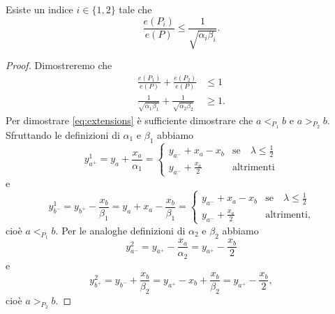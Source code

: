 \appendix
\begin{theorem}
    Esiste un indice \(i\in\{1,2\}\) tale che \[\frac{e(P_i)}{e(P)}\le\frac{1}{\sqrt{\alpha_i\beta_i}}.\]
\end{theorem}
\begin{proof}
    Dimostreremo che
    \begin{align}
        \frac{e(P_1)}{e(P)}+\frac{e(P_2)}{e(P)}&\le 1 \label{eq:extensions} \\
        \frac{1}{\sqrt{\alpha_1\beta_1}}+\frac{1}{\sqrt{\alpha_2\beta_2}}&\ge 1. \label{eq:inverseroots}
    \end{align}
    Per dimostrare \eqref{eq:extensions} \`e sufficiente dimostrare che \(a<_{P_1} b\) e \(a>_{P_2} b\). Sfruttando le definizioni di \(\alpha_1\) e \(\beta_1\) abbiamo
    \[
        y_{a^+}^1 = y_a+\frac{x_a}{\alpha_1} = 
        \begin{cases}
            y_{a^-}+x_a-x_b &\text{se}\quad\lambda\le\frac{1}{2}\\
            y_{a^-}+\frac{x_a}{2} &\text{altrimenti}
        \end{cases}
    \]
    e
    \[
        y_{b^-}^1 = y_{b^+}-\frac{x_b}{\beta_1} = y_a+x_a-\frac{x_b}{\beta_1} =
        \begin{cases}
            y_{a^-}+x_a-x_b &\text{se}\quad\lambda\le\frac{1}{2}\\
            y_{a^-}+\frac{x_a}{2} &\text{altrimenti,}
        \end{cases}
    \]
    cio\`e \(a<_{P_1} b\). Per le analoghe definizioni di \(\alpha_2\) e \(\beta_2\) abbiamo
    \[
        y_{a^-}^2 = y_{a^+}-\frac{x_a}{\alpha_2} = y_{a^+} - \frac{x_b}{2}
    \]
    e
    \[
        y_{b^+}^2 = y_{b^-}+\frac{x_b}{\beta_2} = y_{a^+}-x_b+\frac{x_b}{\beta_2} = y_{a^+}-\frac{x_b}{2},
    \]
    cio\`e \(a>_{P_2} b\).
\end{proof}
